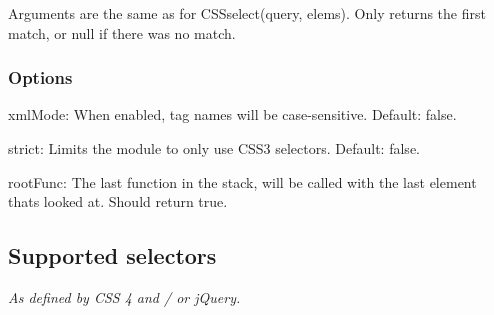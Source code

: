 Arguments are the same as for {\ttfamily C\+S\+Sselect(query, elems)}. Only returns the first match, or {\ttfamily null} if there was no match.

\subsubsection*{Options}


\begin{DoxyItemize}
\item {\ttfamily xml\+Mode}\+: When enabled, tag names will be case-\/sensitive. Default\+: {\ttfamily false}.
\item {\ttfamily strict}\+: Limits the module to only use C\+S\+S3 selectors. Default\+: {\ttfamily false}.
\item {\ttfamily root\+Func}\+: The last function in the stack, will be called with the last element that\textquotesingle{}s looked at. Should return {\ttfamily true}.
\end{DoxyItemize}

\subsection*{Supported selectors}

{\itshape As defined by C\+SS 4 and / or j\+Query.}



